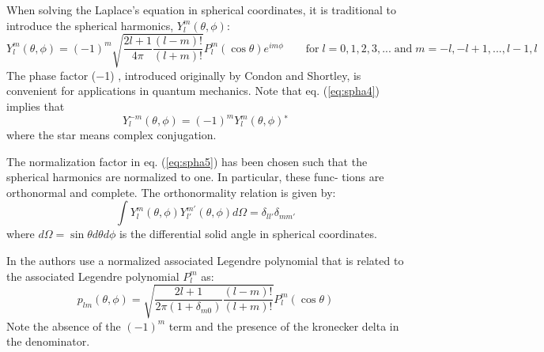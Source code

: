 When solving the Laplace’s equation in spherical coordinates, it is traditional
to introduce the spherical harmonics, $Y_l^m(\theta,\phi)$:
\begin{equation}
Y_l^m(\theta,\phi) = (-1)^m \sqrt{\frac{2l+1}{4\pi} \frac{(l-m)!}{(l+m)!}} P_l^m(\cos\theta) e^{im\phi}
\qquad 
\textrm{for} \; l=0,1,2,3,... \; \textrm{and} \; m=-l,-l+1,...,l-1,l
\label{eq:spha5}
\end{equation}
The phase factor (−1) , introduced originally by Condon and Shortley, is convenient for
applications in quantum mechanics. Note that eq. (\ref{eq:spha4}) implies that
\[
Y_l^{−m} (\theta, \phi) = (−1)^m Y_l^m (\theta,\phi)^∗ 
\]
where the star means complex conjugation.

The normalization factor in eq. (\ref{eq:spha5}) has been
chosen such that the spherical harmonics are normalized to one. In particular, these func-
tions are orthonormal and complete. The orthonormality relation is given by:
\[
\int Y_l^m(\theta,\phi) Y_{l'}^{m'}(\theta,\phi) d\Omega = \delta_{ll'} \delta_{mm'}
\]
where $d\Omega = \sin\theta d\theta d\phi$ is the differential solid angle in spherical coordinates.



\begin{remark}
In \cite{zhmt08} the authors use a normalized associated Legendre
polynomial that is related to the associated Legendre polynomial $P_l^m$ as:
\[
p_{lm}(\theta,\phi) = \sqrt{\frac{2l+1}{2\pi(1+\delta_{m0})} \frac{(l-m)!}{(l+m)!}} P_l^m(\cos\theta)
\]
Note the absence of the $(-1)^m$ term and the presence of the kronecker delta in the denominator.
\end{remark}
